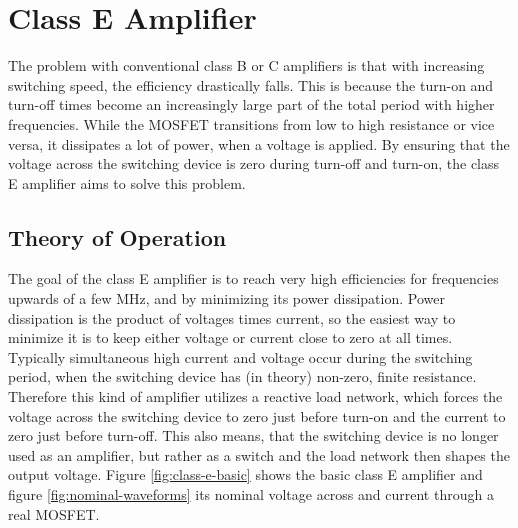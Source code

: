 \section{Class E Amplifier}

The problem with conventional class B or C amplifiers is that with increasing switching speed, the efficiency drastically falls. This is because the turn-on and turn-off times become an increasingly large part of the total period with higher frequencies. While the MOSFET transitions from low to high resistance or vice versa, it dissipates a lot of power, when a voltage is applied. By ensuring that the voltage across the switching device is zero during turn-off and turn-on, the class E amplifier aims to solve this problem.

\subsection{Theory of Operation}

The goal of the class E amplifier is to reach very high efficiencies for frequencies upwards of a few MHz, and by minimizing its power dissipation. Power dissipation is the product of voltages times current, so the easiest way to minimize it is to keep either voltage or current close to zero at all times. Typically simultaneous high current and voltage occur during the switching period, when the switching device has (in theory) non-zero, finite resistance. Therefore this kind of amplifier utilizes a reactive load network, which forces the voltage across the switching device to zero just before turn-on and the current to zero just before turn-off. This also means, that the switching device is no longer used as an amplifier, but rather as a switch and the load network then shapes the output voltage. Figure \ref{fig:class-e-basic} shows the basic class E amplifier and figure \ref{fig:nominal-waveforms} its nominal voltage across and current through a real MOSFET.

